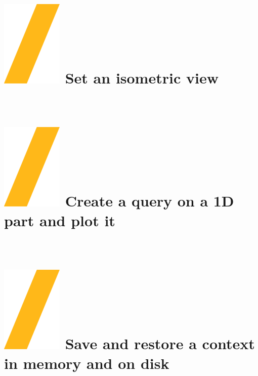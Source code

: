 \documentclass[9pt,landscape]{article}
\begin{document}
\begin{multicols}{3}

\section{{\includegraphics[height=\fontcharht\font`\S]{slash.png}  Set an isometric view}} \\


\section{{\includegraphics[height=\fontcharht\font`\S]{slash.png}  Create a query on a 1D part and plot it}} \\



\section{{\includegraphics[height=\fontcharht\font`\S]{slash.png}  Save and restore a context in memory and on disk}} \\


\end{multicols}
\end{document}
